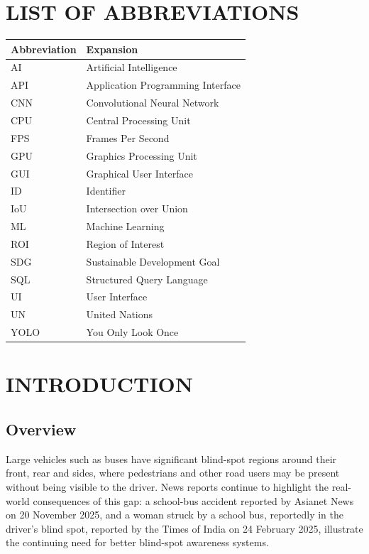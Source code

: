 \documentclass[12pt,a4paper]{report}
\begin{document}
\tableofcontents
\newpage
\listoffigures
\listoftables
\newpage

\chapter*{LIST OF ABBREVIATIONS}
\begin{center}
\begin{tabular}{|p{1.6in}|p{4.3in}|}
\hline
\textbf{Abbreviation} & \textbf{Expansion} \\ \hline
AI & Artificial Intelligence \\ \hline
API & Application Programming Interface \\ \hline
CNN & Convolutional Neural Network \\ \hline
CPU & Central Processing Unit \\ \hline
FPS & Frames Per Second \\ \hline
GPU & Graphics Processing Unit \\ \hline
GUI & Graphical User Interface \\ \hline
ID & Identifier \\ \hline
IoU & Intersection over Union \\ \hline
ML & Machine Learning \\ \hline
ROI & Region of Interest \\ \hline
SDG & Sustainable Development Goal \\ \hline
SQL & Structured Query Language \\ \hline
UI & User Interface \\ \hline
UN & United Nations \\ \hline
YOLO & You Only Look Once \\ \hline
\end{tabular}
\end{center}
\newpage

\setcounter{page}{1}
\pagestyle{bodyps}

\chapter{INTRODUCTION}

\section{Overview}
Large vehicles such as buses have significant blind-spot regions around their front, rear and sides, where pedestrians and other road users may be present without being visible to the driver. News reports continue to highlight the real-world consequences of this gap: a school-bus accident reported by Asianet News on 20 November 2025, and a woman struck by a school bus, reportedly in the driver's blind spot, reported by the Times of India on 24 February 2025, illustrate the continuing need for better blind-spot awareness systems.
\end{document}
